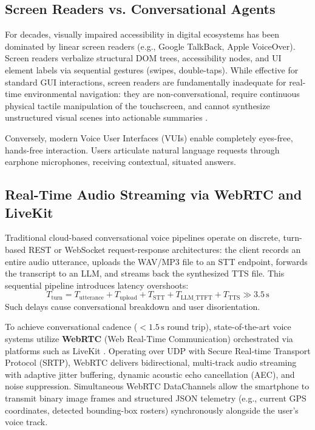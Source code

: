 \documentclass[10pt,twocolumn]{article}
\begin{document}
\subsection{Screen Readers vs. Conversational Agents}
For decades, visually impaired accessibility in digital ecosystems has been dominated by linear screen readers (e.g., Google TalkBack, Apple VoiceOver). Screen readers verbalize structural DOM trees, accessibility nodes, and UI element labels via sequential gestures (swipes, double-taps). While effective for standard GUI interactions, screen readers are fundamentally inadequate for real-time environmental navigation: they are non-conversational, require continuous physical tactile manipulation of the touchscreen, and cannot synthesize unstructured visual scenes into actionable summaries \cite{kalia2010spatial, brady2013visual}.

Conversely, modern Voice User Interfaces (VUIs) enable completely eyes-free, hands-free interaction. Users articulate natural language requests through earphone microphones, receiving contextual, situated answers.

\subsection{Real-Time Audio Streaming via WebRTC and LiveKit}
Traditional cloud-based conversational voice pipelines operate on discrete, turn-based REST or WebSocket request-response architectures: the client records an entire audio utterance, uploads the WAV/MP3 file to an STT endpoint, forwards the transcript to an LLM, and streams back the synthesized TTS file. This sequential pipeline introduces latency overshoots:
\begin{equation}
    T_{\text{turn}} = T_{\text{utterance}} + T_{\text{upload}} + T_{\text{STT}} + T_{\text{LLM\_TTFT}} + T_{\text{TTS}} \gg 3.5\,\text{s}
\end{equation}
Such delays cause conversational breakdown and user disorientation.

To achieve conversational cadence ($<1.5\,\text{s}$ round trip), state-of-the-art voice systems utilize \textbf{WebRTC} (Web Real-Time Communication) orchestrated via platforms such as LiveKit \cite{livekit2024}. Operating over UDP with Secure Real-time Transport Protocol (SRTP), WebRTC delivers bidirectional, multi-track audio streaming with adaptive jitter buffering, dynamic acoustic echo cancellation (AEC), and noise suppression. Simultaneous WebRTC DataChannels allow the smartphone to transmit binary image frames and structured JSON telemetry (e.g., current GPS coordinates, detected bounding-box rosters) synchronously alongside the user's voice track.
\end{document}
